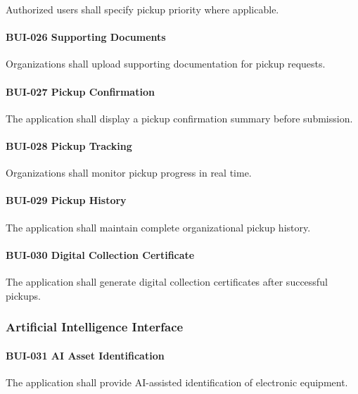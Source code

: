 Authorized users shall specify pickup priority where applicable.

\paragraph{BUI-026 Supporting Documents}

Organizations shall upload supporting documentation for pickup requests.

\paragraph{BUI-027 Pickup Confirmation}

The application shall display a pickup confirmation summary before
submission.

\paragraph{BUI-028 Pickup Tracking}

Organizations shall monitor pickup progress in real time.

\paragraph{BUI-029 Pickup History}

The application shall maintain complete organizational pickup history.

\paragraph{BUI-030 Digital Collection Certificate}

The application shall generate digital collection certificates after
successful pickups.


\subsubsection*{Artificial Intelligence Interface}

\paragraph{BUI-031 AI Asset Identification}

The application shall provide AI-assisted identification of electronic
equipment.

